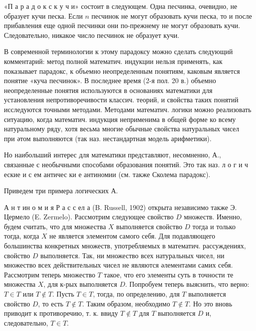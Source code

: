 \documentclass[10pt]{article}
\begin{document}
«П а р а д о к с к у ч и» состоит в следующем. Одна песчинка, очевидно, не образует кучи песка. Если $n$ песчинок не могут образовать кучи песка, то и после прибавления еще одной песчинки они по-прежнему не могут образовать кучи. Следовательно, никакое число песчинок не образует кучи.



В современной терминологии к этому парадоксу можно сделать следующий комментарий: метод полной математич. индукции нельзя применять, как показывает парадокс, к объемно неопределенным понятиям, каковым является понятие «куча песчинок». В последнее время (2-я пол. 20 в.) объемно неопределенные понятия используются в основаниях математики для установления непротиворечивости классич. теорий, и свойства таких понятий исследуются точными методами. Методами математич. логики можно реализовать ситуацию, когда математич. индукция неприменима в общей форме ко всему натуральному ряду, хотя весьма многие обычные свойства натуральных чисел при әтом выполняются (так наз. нестандартная модель арифметики).



Но наибольший интерес для математики представляют, несомненно, А., связанные с необычными способами образования понятий. Это так наз. л о г и ч еские и с ем античес ки е антиномии (см. также Сколема парадокс).



Приведем три примера логических А.



А н т ин о м и я Р а с с ел а (B. Russell, 1902) открыта независимо также Э. Цермело (E. Zermelo). Рассмотрим следующее свойство $D$ множеств. Именно, будем считать, что для множества $X$ выполняется свойство $D$ тогда и только тогда, когда $X$ не является элементом самого себя. Для подавляющего большинства конкретных множеств, употребляемых в математич. рассуждениях, свойство $D$ выполняется. Так, ни множество всех натуральных чисел, ни множество всех действительных чисел не являются әлементами самих себя. Рассмотрим теперь множество $T$ такое, что его элементы суть в точности те множества $X$, для к-рых выполняется $D$. Попробуем теперь выяснить, что верно: $T \in T$ или $T \notin T$. Пусть $T \in T$, тогда, по определению, для $T$ выполняется свойство $D$, то есть $T \notin T$. Таким образом, необходимо $T \notin T$. Но это вновь приводит к противоречию, т. к. ввиду $T \notin T$ для $T$ выполняется $D$ и, следовательно, $T \in T$.
\end{document}
